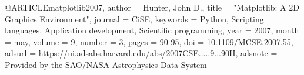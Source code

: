 
@ARTICLE{matplotlib2007,
       author = {{Hunter}, John D.},
        title = "{Matplotlib: A 2D Graphics Environment}",
      journal = {CiSE},
     keywords = {Python, Scripting languages, Application development, Scientific programming},
         year = 2007,
        month = may,
       volume = {9},
       number = {3},
        pages = {90-95},
          doi = {10.1109/MCSE.2007.55},
       adsurl = {https://ui.adsabs.harvard.edu/abs/2007CSE.....9...90H},
      adsnote = {Provided by the SAO/NASA Astrophysics Data System}
}
